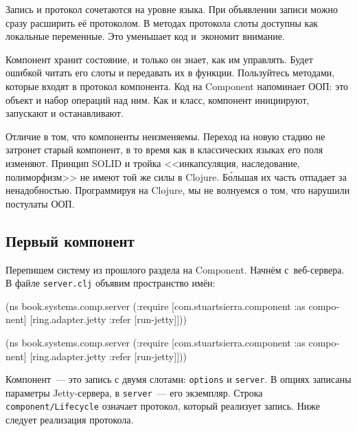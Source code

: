 Запись и протокол сочетаются на уровне языка. При объявлении записи можно сразу
расширить её протоколом. В методах протокола слоты доступны как локальные
переменные. Это уменьшает код и~экономит внимание.


Компонент хранит состояние, и только он знает, как им управлять. Будет ошибкой
читать его слоты и передавать их в функции. Пользуйтесь методами, которые входят
в протокол компонента. Код на Component напоминает ООП: это объект и набор
операций над ним. Как и класс, компонент инициируют, запускают и останавливают.


Отличие в том, что компоненты неизменяемы. Переход на новую стадию не затронет
старый компонент, в то время как в классических языках его поля
изменяют. Принцип SOLID и тройка <<инкапсуляция, наследование, полиморфизм>> не
имеют той же силы в Clojure. Б\'{о}льшая их часть отпадает за
ненадобностью. Программируя на Clojure, мы не волнуемся о том, что нарушили
постулаты ООП.

\subsection{Первый компонент}

Перепишем систему из прошлого раздела на Component. Начнём с~веб-сервера. В
файле \verb|server.clj| объявим пространство имён:

\ifnarrow

\begin{english}
  \begin{clojure}
(ns book.systems.comp.server
  (:require
   [com.stuartsierra.component
    :as component]
   [ring.adapter.jetty
    :refer [run-jetty]]))
  \end{clojure}
\end{english}

\else

\begin{english}
  \begin{clojure}
(ns book.systems.comp.server
  (:require
   [com.stuartsierra.component :as component]
   [ring.adapter.jetty :refer [run-jetty]]))
  \end{clojure}
\end{english}

\fi

Компонент~--- это запись с двумя слотами: \verb|options| и \verb|server|. В
опциях записаны параметры Jetty-сервера, в \verb|server|~--- его
экземпляр. Строка \verb|component/Lifecycle| означает протокол, который
реализует запись. Ниже следует реализация протокола.

